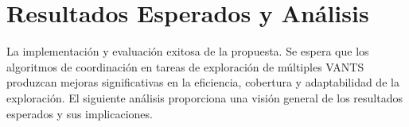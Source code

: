 \documentclass[sigconf]{acmart}
\begin{document}






\section{Resultados Esperados y Análisis}

La implementación y evaluación exitosa de la propuesta. Se espera que los algoritmos de coordinación en tareas de exploración de múltiples VANTS produzcan mejoras significativas en la eficiencia, cobertura y adaptabilidad de la exploración. El siguiente análisis proporciona una visión general de los resultados esperados y sus implicaciones.
\end{document}

